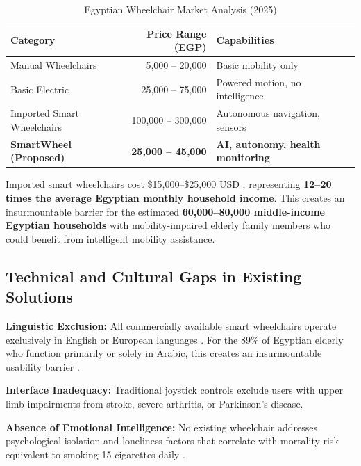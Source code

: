 \documentclass[12pt,a4paper]{report}
\renewcommand{\arraystretch}{1.45}
\renewcommand{\arraystretch}{1.3}
\begin{document}
\begin{table}[H]
\centering
\caption{Egyptian Wheelchair Market Analysis (2025)}
\label{tab:market_analysis}
{\renewcommand{\arraystretch}{1.7}
\begin{tabularx}{\textwidth}{@{}lrX@{}}
\toprule
\textbf{Category} & \textbf{Price Range (EGP)} & \textbf{Capabilities} \\
\midrule
Manual Wheelchairs                        & 5,000 -- 20,000     & Basic mobility only \\
Basic Electric                            & 25,000 -- 75,000    & Powered motion, no intelligence \\
Imported Smart Wheelchairs                & 100,000 -- 300,000  & Autonomous navigation, sensors \\
\rowcolor{lightgray}
\textbf{SmartWheel (Proposed)}            & \textbf{25,000 -- 45,000} & \textbf{AI, autonomy, health monitoring} \\
\bottomrule
\end{tabularx}}
\end{table}

Imported smart wheelchairs cost \$15,000--\$25,000 USD \cite{grandview_market}, representing \textbf{12--20 times the average Egyptian monthly household income}. This creates an insurmountable barrier for the estimated \textbf{60,000--80,000 middle-income Egyptian households} with mobility-impaired elderly family members who could benefit from intelligent mobility assistance.

\subsection{Technical and Cultural Gaps in Existing Solutions}

\textbf{Linguistic Exclusion:} All commercially available smart wheelchairs operate exclusively in English or European languages \cite{grandview_market}. For the 89\% of Egyptian elderly who function primarily or solely in Arabic, this creates an insurmountable usability barrier .

\textbf{Interface Inadequacy:} Traditional joystick controls exclude users with upper limb impairments from stroke, severe arthritis, or Parkinson's disease.

\textbf{Absence of Emotional Intelligence:} No existing wheelchair addresses psychological isolation and loneliness factors that correlate with mortality risk equivalent to smoking 15 cigarettes daily \cite{who_disability}.
\end{document}

